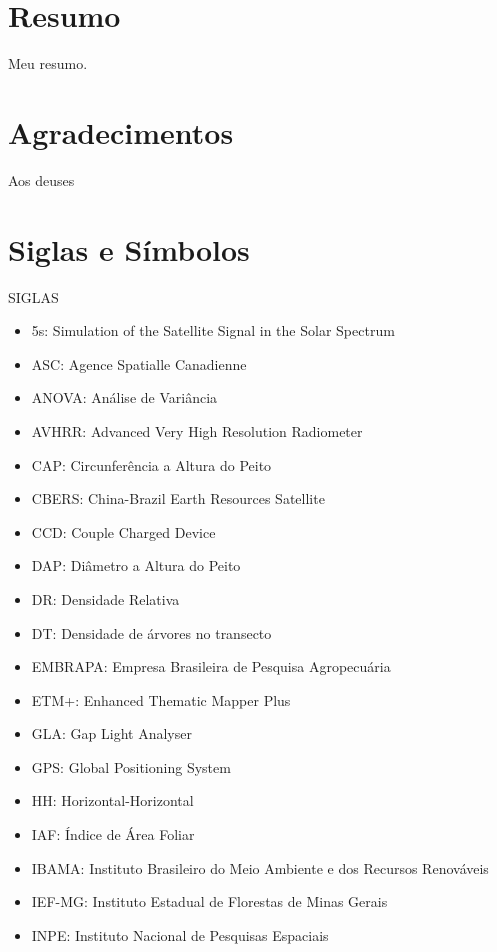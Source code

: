 \documentclass[
    oneside,
    a4paper,
    12pt
]{book}
\begin{document}
\tableofcontents

\listoffigures

\listoftables
\pagestyle{plain}
\frontmatter

\chapter{Resumo} Meu resumo.

\chapter{Agradecimentos} Aos deuses

\chapter{Siglas e Símbolos} SIGLAS
\begin{itemize}
    \item 5s: Simulation of the Satellite Signal in the Solar Spectrum
    \item ASC: Agence Spatialle Canadienne
    \item ANOVA: Análise de Variância
    \item AVHRR: Advanced Very High Resolution Radiometer
    \item CAP: Circunferência a Altura do Peito
    \item CBERS: China-Brazil Earth Resources Satellite
    \item CCD: Couple Charged Device
    \item DAP: Diâmetro a Altura do Peito
    \item DR: Densidade Relativa
    \item DT: Densidade de árvores no transecto
    \item EMBRAPA: Empresa Brasileira de Pesquisa Agropecuária
    \item ETM+: Enhanced Thematic Mapper Plus
    \item GLA: Gap Light Analyser
    \item GPS: Global Positioning System
    \item HH: Horizontal-Horizontal
    \item IAF: Índice de Área Foliar
    \item IBAMA: Instituto Brasileiro do Meio Ambiente e dos Recursos Renováveis
    \item IEF-MG: Instituto Estadual de Florestas de Minas Gerais
    \item INPE: Instituto Nacional de Pesquisas Espaciais

\end{itemize}
\end{document}
